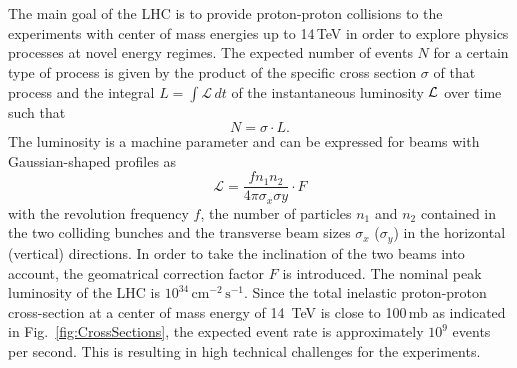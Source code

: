 \\
\\
The main goal of the LHC is to provide proton-proton collisions to the experiments with center of mass energies up to 14\,TeV in order to explore physics processes at novel energy regimes. The expected number of events $N$ for a certain type of process is given by the product of the specific cross section $\sigma$ of that process and the integral $L = \int \mathcal{L}  \, dt$ of the instantaneous luminosity $\cal L$ over time such that
\begin{equation}
  N = \sigma \cdot L . 
  \label{eq:lumi}
\end{equation}
The luminosity is a machine parameter and can be expressed for beams with Gaussian-shaped profiles as  
\begin{equation}
  \mathcal{L} = \frac{f n_{1} n_{2}}{4 \pi \sigma_{x} \sigma{y}} \cdot F
  \label{eq:lumi}
\end{equation}
with the revolution frequency $f$, the number of particles $n_1$ and $n_2$ contained in the two colliding bunches and the transverse beam sizes $\sigma_{x}$ ($\sigma_{y}$) in the horizontal (vertical) directions. In order to take the inclination of the two beams into account, the geomatrical correction factor $F$ is introduced. The nominal peak luminosity of the LHC is $10^{34} \, \mathrm{cm}^{-2} \, \mathrm{s}^{-1}$. Since the total inelastic proton-proton cross-section at a center of mass energy of 14~TeV is close to 100\,mb as indicated in Fig.~\ref{fig:CrossSections}, the expected event rate is approximately $10^9$ events per second. This is resulting in high technical challenges for the experiments. \\
